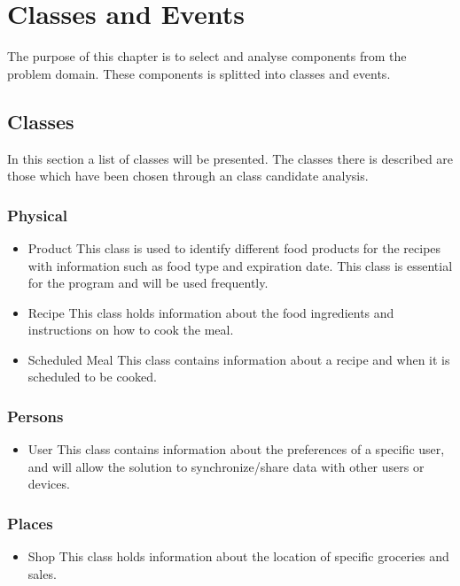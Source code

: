 \chapter{Classes and Events}
The purpose of this chapter is to select and analyse components from the problem domain. These components is splitted into classes and events.

\section{Classes}
In this section a list of classes will be presented. The classes there is described are those which have been chosen through an class candidate analysis.

\subsection{Physical}
\begin{itemize}
\item Product
    \subitem This class is used to identify different food products for the recipes with information such as food type and expiration date. This class is essential for the program and will be used frequently.
\item Recipe
    \subitem This class holds information about the food ingredients and instructions on how to cook the meal.
\item Scheduled Meal
    \subitem This class contains information about a recipe and when it is scheduled to be cooked.
\end{itemize}

\subsection{Persons}
\begin{itemize}
\item User
    \subitem This class contains information about the preferences of a specific user, and will allow the solution to synchronize/share data with other users or devices.
\end{itemize}

\subsection{Places}
\begin{itemize}
\item Shop
    \subitem This class holds information about the location of specific groceries and sales.
\end{itemize}


